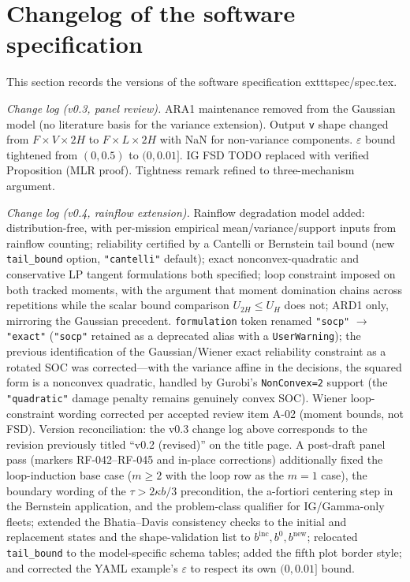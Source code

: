 \section{Changelog of the software specification}
\label{sec:spec_changelog}

This section records the versions of the software specification 	exttt{spec/spec.tex}.

\emph{Change log (v0.3, panel review).}
ARA1 maintenance removed from the Gaussian model (no literature basis for the
variance extension). Output \texttt{v} shape changed from $F \times V \times 2H$
to $F \times L \times 2H$ with NaN for non-variance components.
$\varepsilon$ bound tightened from $(0, 0.5)$ to $(0, 0.01]$.
IG FSD TODO replaced with verified Proposition (MLR proof).
Tightness remark refined to three-mechanism argument.

\emph{Change log (v0.4, rainflow extension).}
Rainflow degradation model added: distribution-free, with per-mission empirical
mean/variance/support inputs from rainflow counting; reliability certified by a
Cantelli or Bernstein tail bound (new \texttt{tail\_bound} option,
\texttt{"cantelli"} default); exact nonconvex-quadratic and conservative LP
tangent formulations both specified; loop constraint imposed on both tracked
moments, with the argument that moment domination chains across repetitions
while the scalar bound comparison $U_{2H} \leq U_H$ does not; ARD1 only,
mirroring the Gaussian precedent. \texttt{formulation} token renamed
\texttt{"socp"} $\to$ \texttt{"exact"} (\texttt{"socp"} retained as a deprecated
alias with a \texttt{UserWarning}); the previous identification of the
Gaussian/Wiener exact reliability constraint as a rotated SOC was corrected---with
the variance affine in the decisions, the squared form is a nonconvex quadratic,
handled by Gurobi's \texttt{NonConvex=2} support (the \texttt{"quadratic"}
damage penalty remains genuinely convex SOC). Wiener loop-constraint wording
corrected per accepted review item A-02 (moment bounds, not FSD). Version
reconciliation: the v0.3 change log above corresponds to the revision previously
titled ``v0.2 (revised)'' on the title page.
A post-draft panel pass (markers RF-042--RF-045 and in-place corrections)
additionally fixed the loop-induction base case ($m \geq 2$ with
the loop row as the $m=1$ case), the boundary wording of the
$\tau > 2\kappa b/3$ precondition, the a-fortiori centering step in the
Bernstein application, and the problem-class qualifier for IG/Gamma-only
fleets; extended the Bhatia--Davis consistency checks to the initial and
replacement states and the shape-validation list to $b^{\mathrm{inc}}, b^{0},
b^{\mathrm{new}}$; relocated \texttt{tail\_bound} to the model-specific
schema tables; added the fifth plot border style; and corrected the YAML
example's $\varepsilon$ to respect its own $(0, 0.01]$ bound.

